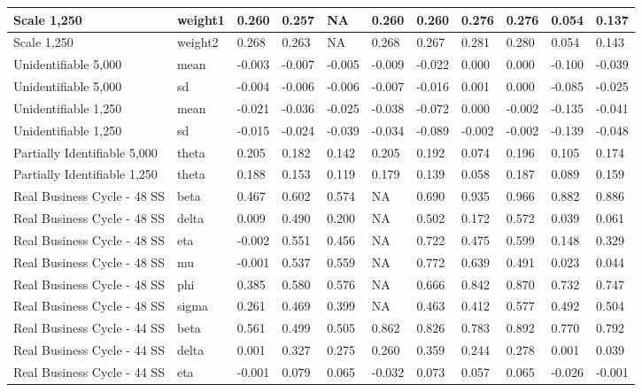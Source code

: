 \documentclass[]{article}
\begin{document}
\begin{tabular}{l|l|l|l|l|l|l|l|l|l|l}
\hline
Scale 1,250 & weight1 & 0.260 & 0.257 & NA & 0.260 & 0.260 & 0.276 & 0.276 & 0.054 & 0.137\\
\hline
Scale 1,250 & weight2 & 0.268 & 0.263 & NA & 0.268 & 0.267 & 0.281 & 0.280 & 0.054 & 0.143\\
\hline
Unidentifiable 5,000 & mean & -0.003 & -0.007 & -0.005 & -0.009 & -0.022 & 0.000 & 0.000 & -0.100 & -0.039\\
\hline
Unidentifiable 5,000 & sd & -0.004 & -0.006 & -0.006 & -0.007 & -0.016 & 0.001 & 0.000 & -0.085 & -0.025\\
\hline
Unidentifiable 1,250 & mean & -0.021 & -0.036 & -0.025 & -0.038 & -0.072 & 0.000 & -0.002 & -0.135 & -0.041\\
\hline
Unidentifiable 1,250 & sd & -0.015 & -0.024 & -0.039 & -0.034 & -0.089 & -0.002 & -0.002 & -0.139 & -0.048\\
\hline
Partially Identifiable 5,000 & theta & 0.205 & 0.182 & 0.142 & 0.205 & 0.192 & 0.074 & 0.196 & 0.105 & 0.174\\
\hline
Partially Identifiable 1,250 & theta & 0.188 & 0.153 & 0.119 & 0.179 & 0.139 & 0.058 & 0.187 & 0.089 & 0.159\\
\hline
Real Business Cycle - 48 SS & beta & 0.467 & 0.602 & 0.574 & NA & 0.690 & 0.935 & 0.966 & 0.882 & 0.886\\
\hline
Real Business Cycle - 48 SS & delta & 0.009 & 0.490 & 0.200 & NA & 0.502 & 0.172 & 0.572 & 0.039 & 0.061\\
\hline
Real Business Cycle - 48 SS & eta & -0.002 & 0.551 & 0.456 & NA & 0.722 & 0.475 & 0.599 & 0.148 & 0.329\\
\hline
Real Business Cycle - 48 SS & mu & -0.001 & 0.537 & 0.559 & NA & 0.772 & 0.639 & 0.491 & 0.023 & 0.044\\
\hline
Real Business Cycle - 48 SS & phi & 0.385 & 0.580 & 0.576 & NA & 0.666 & 0.842 & 0.870 & 0.732 & 0.747\\
\hline
Real Business Cycle - 48 SS & sigma & 0.261 & 0.469 & 0.399 & NA & 0.463 & 0.412 & 0.577 & 0.492 & 0.504\\
\hline
Real Business Cycle - 44 SS & beta & 0.561 & 0.499 & 0.505 & 0.862 & 0.826 & 0.783 & 0.892 & 0.770 & 0.792\\
\hline
Real Business Cycle - 44 SS & delta & 0.001 & 0.327 & 0.275 & 0.260 & 0.359 & 0.244 & 0.278 & 0.001 & 0.039\\
\hline
Real Business Cycle - 44 SS & eta & -0.001 & 0.079 & 0.065 & -0.032 & 0.073 & 0.057 & 0.065 & -0.026 & -0.001\\

\end{tabular}
\end{document}
